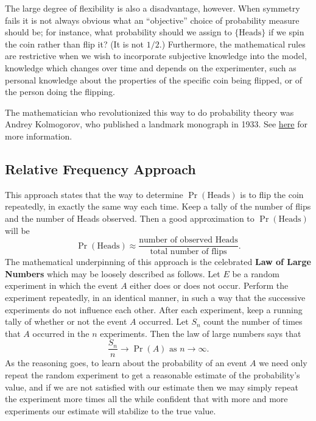 \documentclass[captions=tableheading]{scrbook}
\begin{document}
The large degree of flexibility is also a disadvantage, however. When symmetry fails it is not always obvious what an ``objective'' choice of probability measure should be; for instance, what probability should we assign to \( \{ \mbox{Heads} \} \) if we spin the coin rather than flip it? (It is not \(1/2\).) Furthermore, the mathematical rules are restrictive when we wish to incorporate subjective knowledge into the model, knowledge which changes over time and depends on the experimenter, such as personal knowledge about the properties of the specific coin being flipped, or of the person doing the flipping.

The mathematician who revolutionized this way to do probability theory was Andrey Kolmogorov, who published a landmark monograph in 1933. See \href{http://www-history.mcs.st-andrews.ac.uk/Mathematicians/Kolmogorov.html}{here} for more information.
\subsection{Relative Frequency Approach}
\label{sec-4-3-2}


This approach states that the way to determine \(\Pr(\mbox{Heads})\) is to flip the coin repeatedly, in exactly the same way each time. Keep a tally of the number of flips and the number of Heads observed. Then a good approximation to \(\Pr(\mbox{Heads})\) will be
\begin{equation} 
\Pr(\mbox{Heads})\approx\frac{\mbox{number of observed Heads}}{\mbox{total number of flips}}.
\end{equation}
The mathematical underpinning of this approach is the celebrated \textbf{Law of Large Numbers} which may be loosely described as follows. Let \(E\) be a random experiment in which the event \(A\) either does or does not occur. Perform the experiment repeatedly, in an identical manner, in such a way that the successive experiments do not influence each other. After each experiment, keep a running tally of whether or not the event \(A\) occurred. Let \(S_{n}\) count the number of times that \(A\) occurred in the \(n\) experiments. Then the law of large numbers says that 
\begin{equation}
\frac{S_{n}}{n}\to\Pr(A)\mbox{ as }n\to\infty.
\end{equation}
As the reasoning goes, to learn about the probability of an event \(A\) we need only repeat the random experiment to get a reasonable estimate of the probability's value, and if we are not satisfied with our estimate then we may simply repeat the experiment more times all the while confident that with more and more experiments our estimate will stabilize to the true value. 
\end{document}
